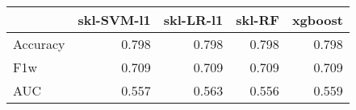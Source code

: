\begin{tabular}{lrrrr}
\toprule
{} &  skl-SVM-l1 &  skl-LR-l1 &  skl-RF &  xgboost \\
\midrule
Accuracy &       0.798 &      0.798 &   0.798 &    0.798 \\
F1w      &       0.709 &      0.709 &   0.709 &    0.709 \\
AUC      &       0.557 &      0.563 &   0.556 &    0.559 \\
\bottomrule
\end{tabular}
